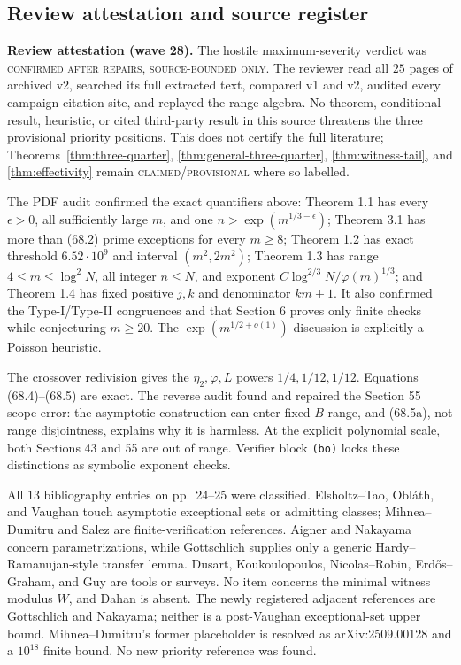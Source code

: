 \documentclass[10pt,reqno]{amsart}
\theoremstyle{definition}
\newcommand{\1}{\mathbf 1}
\begin{document}
\subsection{Review attestation and source register}
\medskip\noindent\textbf{Review attestation (wave 28).}
The hostile maximum-severity verdict was
\textsc{confirmed after repairs, source-bounded only}.  The reviewer read all
$25$ pages of archived v2, searched its full extracted text, compared v1 and
v2, audited every campaign citation site, and replayed the range algebra.
No theorem, conditional result, heuristic, or cited third-party result in
this source threatens the three provisional priority positions.  This does
not certify the full literature; Theorems~\ref{thm:three-quarter},
\ref{thm:general-three-quarter}, \ref{thm:witness-tail}, and
\ref{thm:effectivity} remain \textsc{claimed/provisional} where so labelled.

The PDF audit confirmed the exact quantifiers above: Theorem 1.1 has every
$\epsilon>0$, all sufficiently large $m$, and one
$n>\exp(m^{1/3-\epsilon})$; Theorem 3.1 has more than (68.2) prime exceptions
for every $m\geq8$; Theorem 1.2 has exact threshold $6.52\cdot10^9$ and
interval $(m^2,2m^2)$; Theorem 1.3 has range $4\leq m\leq\log^2N$, all
integer $n\leq N$, and exponent
$C\log^{2/3}N/\varphi(m)^{1/3}$; and Theorem 1.4 has fixed positive $j,k$ and
denominator $km+1$.  It also confirmed the Type-I/Type-II congruences and
that Section 6 proves only finite checks while conjecturing $m\geq20$.
The $\exp(m^{1/2+o(1)})$ discussion is explicitly a Poisson heuristic.

The crossover redivision gives the $\eta_2,\varphi,L$ powers
$1/4,1/12,1/12$.  Equations (68.4)--(68.5) are exact.  The reverse audit
found and repaired the Section 55 scope error: the asymptotic construction
can enter fixed-$B$ range, and (68.5a), not range disjointness, explains why
it is harmless.  At the explicit polynomial scale, both Sections 43 and 55
are out of range.  Verifier block \texttt{(bo)} locks these distinctions as
symbolic exponent checks.

All $13$ bibliography entries on pp.~24--25 were classified.  Elsholtz--Tao,
Obl\'ath, and Vaughan touch asymptotic exceptional sets or admitting classes;
Mihnea--Dumitru and Salez are finite-verification references.  Aigner and
Nakayama \cite{Nakayama} concern parametrizations, while Gottschlich
\cite{Gottschlich} supplies only a generic Hardy--Ramanujan-style transfer
lemma.  Dusart, Koukoulopoulos,
Nicolas--Robin, Erd\H{o}s--Graham, and Guy are tools or surveys.  No item
concerns the minimal witness modulus $W$, and Dahan is absent.  The newly
registered adjacent references are Gottschlich and Nakayama; neither is a
post-Vaughan exceptional-set upper bound.  Mihnea--Dumitru's former
placeholder is resolved as arXiv:2509.00128 and a $10^{18}$ finite bound.
No new priority reference was found.
\end{document}
